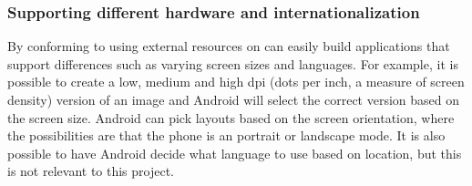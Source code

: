 \subsubsection{Supporting different hardware and internationalization}
By conforming to using external resources on can easily build applications that support differences such as varying screen sizes and languages. For example, it is possible to create a low, medium and high dpi (dots per inch, a measure of screen density) version of an image and Android will select the correct version based on the screen size. Android can pick layouts based on the screen orientation, where the possibilities are that the phone is an portrait or landscape mode. It is also possible to have Android decide what language to use based on location, but this is not relevant to this project. 